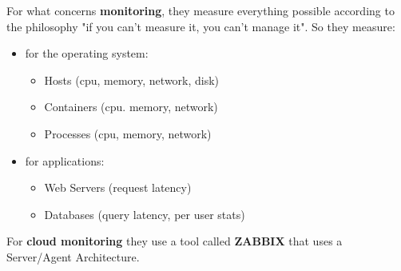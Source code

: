 For what concerns \textbf{monitoring}, they measure everything possible according to the philosophy "if you can't measure it, you can't manage it". So they measure:
\begin{itemize}
   \item for the operating system:
         \begin{itemize}
            \item Hosts (cpu, memory, network, disk)
            \item Containers (cpu. memory, network)
            \item Processes (cpu, memory, network)
         \end{itemize}
   \item for applications:
         \begin{itemize}
            \item Web Servers (request latency)
            \item Databases (query latency, per user stats)
         \end{itemize}
\end{itemize}
For \textbf{cloud monitoring} they use a tool called \textbf{ZABBIX} that uses a Server/Agent Architecture.

